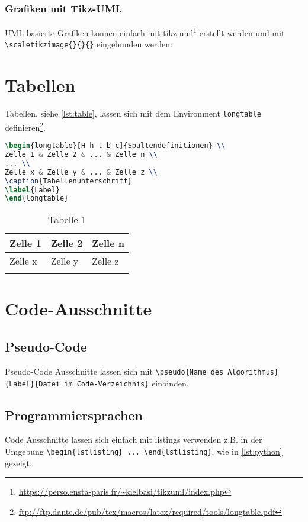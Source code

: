 \subsubsection{Grafiken mit Tikz-UML}
UML basierte Grafiken können einfach mit tikz-uml\footnote{\url{https://perso.ensta-paris.fr/~kielbasi/tikzuml/index.php}} erstellt werden und mit \lstinline|\scaletikzimage{}{}{}| eingebunden werden:

\section{Tabellen}
Tabellen, siehe \autoref{lst:table}, lassen sich mit dem Environment \lstinline|longtable| definieren\footnote{\url{ftp://ftp.dante.de/pub/tex/macros/latex/required/tools/longtable.pdf}}.

\begin{lstlisting}[caption=Tabelle, language=TeX, label=lst:table]
\begin{longtable}[H h t b c]{Spaltendefinitionen} \\
Zelle 1 & Zelle 2 & ... & Zelle n \\
... \\
Zelle x & Zelle y & ... & Zelle z \\
\caption{Tabellenunterschrift}
\label{Label}
\end{longtable}
\end{lstlisting}

\begin{longtable}[H]{|p{}|p{}|p{}|}
\hline
Zelle 1 & Zelle 2 & Zelle n \\
\hline
Zelle x & Zelle y & Zelle z \\
\hline
\caption{Tabelle 1}
\label{tab:tab1}
\end{longtable}


\section{Code-Ausschnitte}

\subsection{Pseudo-Code}
Pseudo-Code Ausschnitte lassen sich mit \lstinline|\pseudo{Name des Algorithmus}{Label}{Datei im Code-Verzeichnis}| einbinden.

\subsection{Programmiersprachen}
Code Ausschnitte lassen sich einfach mit listings verwenden z.B. in der Umgebung \lstinline|\begin{lstlisting} ... \end{lstlisting}|, wie in \autoref{lst:python} gezeigt.

